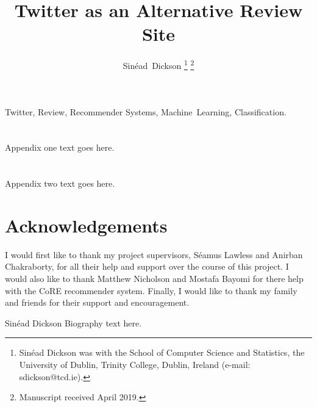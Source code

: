 \documentclass[journal]{IEEEtran}
\begin{document}
\title{Twitter as an Alternative Review Site}

\author{Sin\'ead~Dickson
\thanks{Sin\'ead Dickson was with the School of Computer Science and Statistics, the University of Dublin, Trinity College, Dublin, Ireland (e-mail: sdickson@tcd.ie).}
\thanks{Manuscript received April 2019.}}

\maketitle



\begin{IEEEkeywords}
Twitter, Review, Recommender Systems, Machine~Learning, Classification.
\end{IEEEkeywords}







\appendices
\section{}
Appendix one text goes here.

\section{}
Appendix two text goes here.

\section*{Acknowledgements}
I would first like to thank my project supervisors, S\'eamus Lawless and Anirban Chakraborty, for all their help and support over the course of this project. 
I would also like to thank Matthew Nicholson and Mostafa Bayomi for there help with the CoRE recommender system.
Finally, I would like to thank my family and friends for their support and encouragement.




\begin{IEEEbiography}{Sin\'ead Dickson}
Biography text here.
\end{IEEEbiography}
\end{document}
